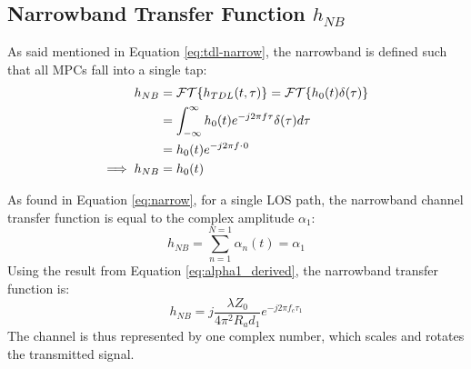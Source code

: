 \subsection{Narrowband Transfer Function $h_{NB}$}
As said mentioned in Equation \ref{eq:tdl-narrow}, the narrowband is defined such that all MPCs fall into a single tap:
\begin{align}
	h_{NB} &= \mathcal{FT}\{ h_{TDL}(t, \tau)\} = \mathcal{FT}\{ h_{0}(t)\delta(\tau)\} \\
	&= \int_{-\infty}^{\infty} h_0(t) e^{-j2\pi f \tau} \delta(\tau) d\tau \\
	&=h_0(t)e^{-j2\pi f \cdot \hspace{0.05em} 0} \\
	\implies h_{NB} &= h_0(t)
\end{align}

As found in Equation \ref{eq:narrow}, for a single LOS path, the narrowband channel transfer function is equal to the complex amplitude $\alpha_1$:
\begin{equation}
	h_{NB} = \sum_{n=1}^{N=1} \alpha_n(t) = \alpha_1
\end{equation}
Using the result from Equation \ref{eq:alpha1_derived}, the narrowband transfer function is:
\begin{equation}
	\boxed{h_{NB} = j \frac{\lambda Z_0}{4\pi^2 R_a d_1} e^{-j2\pi f_c \tau_1}}
	\label{eq:los_narrowband_tf_detailed}
\end{equation}
The channel is thus represented by one complex number, which scales and rotates the transmitted signal.

